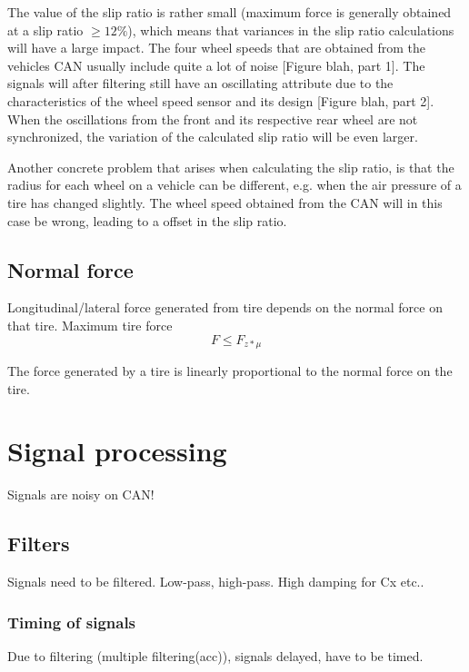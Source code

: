 The value of the slip ratio is rather small (maximum force is generally obtained at a slip ratio $ \geq 12 \% $), which means that variances in the slip ratio calculations will have a large impact. The four wheel speeds that are obtained from the vehicles CAN usually include quite a lot of noise [Figure blah, part 1]. The signals will after filtering still have an oscillating attribute due to the characteristics of the wheel speed sensor and its design [Figure blah, part 2]. When the oscillations from the front and its respective rear wheel are not synchronized, the variation of the calculated slip ratio will be even larger.

Another concrete problem that arises when calculating the slip ratio, is that the radius for each wheel on a vehicle can be different, e.g. when the air pressure of a tire has changed slightly. The wheel speed obtained from the CAN will in this case be wrong, leading to a offset in the slip ratio.

\subsection{Normal force}

Longitudinal/lateral force generated from tire depends on the normal force on that tire. Maximum tire force
\begin{equation}
	F \leq F_{z*\mu}
\end{equation}

The force generated by a tire is linearly proportional to the normal force on the tire. 


\section{Signal processing}

Signals are noisy on CAN!



\subsection{Filters}

Signals need to be filtered. Low-pass, high-pass. High damping for Cx etc..


\subsubsection{Timing of signals}

Due to filtering (multiple filtering(acc)), signals delayed, have to be timed.

